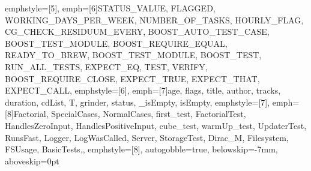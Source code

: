 {emphstyle=[5]{\color{Maroon}}, %
emph=[6]{STATUS_VALUE, FLAGGED, WORKING_DAYS_PER_WEEK, NUMBER_OF_TASKS, HOURLY_FLAG,
         CG_CHECK_RESIDUUM_EVERY, BOOST_AUTO_TEST_CASE, BOOST_TEST_MODULE, BOOST_REQUIRE_EQUAL,
         READY_TO_BREW, BOOST_TEST_MODULE, BOOST_TEST, RUN_ALL_TESTS, EXPECT_EQ, TEST, VERIFY,
         BOOST_REQUIRE_CLOSE, EXPECT_TRUE, EXPECT_THAT, EXPECT_CALL},
emphstyle=[6]{\color{Gray}}, %
emph=[7]{age, flags, title, author, tracks, duration, cdList, T, grinder, status, _isEmpty, isEmpty},
emphstyle=[7]{\color{Peach!50!Purple}}, %
emph=[8]{Factorial, SpecialCases, NormalCases, first_test, FactorialTest, HandlesZeroInput,
         HandlesPositiveInput, cube_test, warmUp_test, UpdaterTest, RunsFast, Logger, LogWasCalled,
         Server, StorageTest, Dirac_M, Filesystem, FSUsage, BasicTests,},
emphstyle=[8]{\color{Blue}}, %
autogobble=true, %
belowskip=-7mm,
aboveskip=0pt
}

